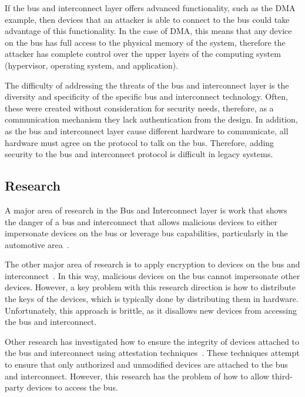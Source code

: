\documentclass[11pt,letterpaper]{article}
\begin{document}
If the bus and interconnect layer offers advanced functionality, such
as the DMA example, then devices that an attacker is able to connect
to the bus could take advantage of this functionality. In the case of
DMA, this means that any device on the bus has full access to the
physical memory of the system, therefore the attacker has complete
control over the upper layers of the computing system (hypervisor,
operating system, and application).

The difficulty of addressing the threats of the bus and interconnect
layer is the diversity and specificity of the specific bus and
interconnect technology. Often, these were created without
consideration for security needs, therefore, as a communication
mechanism they lack authentication from the design. In addition, as
the bus and interconnect layer cause different hardware to
communicate, all hardware must agree on the protocol to talk on the
bus. Therefore, adding security to the bus and interconnect protocol
is difficult in legacy systems.  

\subsection{Research}

A major area of research in the Bus and Interconnect layer is work
that shows the danger of a bus and interconnect that allows malicious
devices to either impersonate devices on the bus or leverage bus
capabilities, particularly in the automotive area~\cite{Bonkoski2013,
  Checkoway2011, Hoppe2008, Koscher2010, Rouf2010, Sang2010}.

The other major area of research is to apply encryption to devices on
the bus and interconnect~\cite{Groza2012, Herrewege2011, Jiang2012,
  Schweppe2011, Stewin2014, Szilagyi2010}. In this way, malicious
devices on the bus cannot impersonate other devices. However, a key
problem with this research direction is how to distribute the keys of
the devices, which is typically done by distributing them in hardware.
Unfortunately, this approach is brittle, as it disallows new devices
from accessing the bus and interconnect.

Other research has investigated how to ensure the integrity of devices
attached to the bus and interconnect using attestation
techniques~\cite{Li2010, Li2011}. These techniques attempt to ensure
that only authorized and unmodified devices are attached to the bus
and interconnect. However, this research has the problem of how to
allow third-party devices to access the bus.
\end{document}
